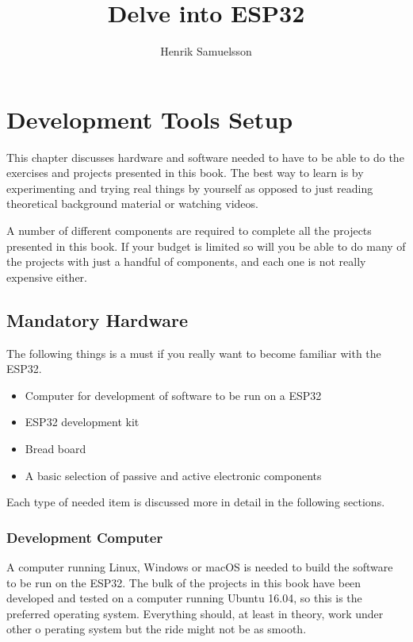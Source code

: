 \documentclass{tufte-book}
\title{Delve into ESP32}
\author{Henrik Samuelsson}
\begin{document}
\maketitle

\cleardoublepage

\tableofcontents

\chapter{Development Tools Setup}

This chapter discusses hardware and software needed to have to be able to do 
the exercises and projects presented in this book. The best way to learn is by 
experimenting and trying real things by yourself as opposed to just reading 
theoretical background material or watching videos.

A number of different components are required to complete all the projects 
presented in this book. If your budget is limited so will you be able to do 
many of the projects with just a handful of components, and each one is not 
really expensive either.

\section{Mandatory Hardware}\label{sec:hardware}
The following things is a must if you really want to become familiar with the ESP32.

\begin{itemize}
	\item Computer for development of software to be run on a ESP32
	\item ESP32 development kit
	\item Bread board
	\item A basic selection of passive and active electronic components
\end{itemize}

Each type of needed item is discussed more in detail in the following sections.

\subsection{Development Computer}
A computer running Linux, Windows or macOS is needed to build the software to 
be run on the ESP32. The bulk of the projects in this book have been developed 
and tested on a computer running Ubuntu 16.04, so this is the preferred 
operating system. Everything should, at least in theory, work under other o
perating system but the ride might not be as smooth.
\end{document}
